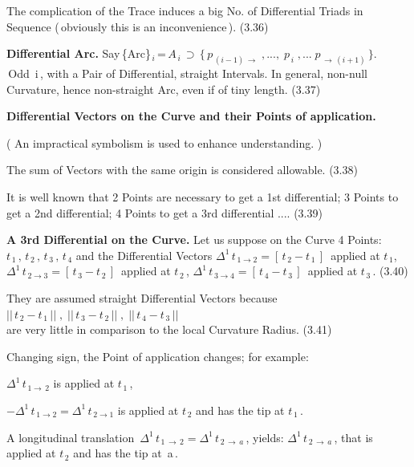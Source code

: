 \documentclass[12pt]{article} %
\begin{document}
\noindent The complication of the Trace induces a big No. of Differential Triads in Sequence (\,obviously this is an inconvenience\,). (3.36)  

\noindent \textbf{Differential Arc.} Say\,\{Arc\}$_{\,i}$\,=\,$A_{\,i}\,\supset\,\{\,p_{\,(i-1)\,\to}\;, ... ,\;p_{\,i}\;, ...\;p_{\,\to\,(i+1)}\,\}$.\\\,Odd \,i\,, with a Pair of Differential, straight Intervals. In general, non-null Curvature, hence non-straight Arc, even if of tiny length. (3.37)

\noindent \textbf{Differential Vectors on the Curve and their Points of application.}

\noindent ( An impractical symbolism is used to enhance understanding. )
 
\noindent The sum of Vectors with the same origin is considered allowable. \qquad (3.38)

\noindent It is well known that 2 Points are necessary to get a 1st differential; 3 Points to get a 2nd differential; 4 Points to get a 3rd 
differential .... \qquad (3.39)
 
\noindent\textbf{A 3rd Differential on the Curve.} Let us suppose on the Curve 4 Points:\; $t_{\,1}\,,\,t_{\,2}\,,\,t_{\,3}\,,\,t_{\,4}$ and the Differential Vectors\; $\Delta^{1}\,t_{\,1 \to 2} = [\,t_{\,2} - t_{\,1}\,]$\, applied at $t_{\,1}$\;, $\Delta^{1}\,t_{\,2 \to 3} = [\,t_{\,3} - t_{\,2}\,]$\, applied at $t_{\,2}$\,, $\Delta^{1}\,t_{\,3 \to 4} = [\,t_{\,4} - t_{\,3}\,]$\, applied at $t_{\,3}$\,. \qquad (3.40)

\noindent They are assumed straight Differential Vectors because\\ $||\,t_{\,2} - t_{\,1}\,||\;,\;||\,t_{\,3} - t_{\,2}\,||\;,\;||\,t_{\,4} - t_{\,3}\,||$\\ are very little in comparison to the local Curvature Radius. \qquad (3.41)

\noindent Changing sign, the Point of application changes; for example:

\noindent $\Delta^{1}\,t_{\,1 \to\,2}$ is applied at $t_{\,1}$\,,

\noindent  $- \Delta^{1}\,t_{\,1 \to 2} = \Delta^{1}\,t_{\,2 \to 1}$\; is applied at $t_{\,2}$ and has the tip at $t_{\,1}$\,.

\noindent A longitudinal translation\,  $\Delta^{1}\,t_{\,1\, \to\, 2} = \Delta^{1}\,t_{\,2\, \to\, a}$\,, yields:  $\Delta^{1}\,t_{\,2\,\to\, a}$\,, that is applied at $t_{\,2}$ and has the tip at\, a\,.
\end{document}

